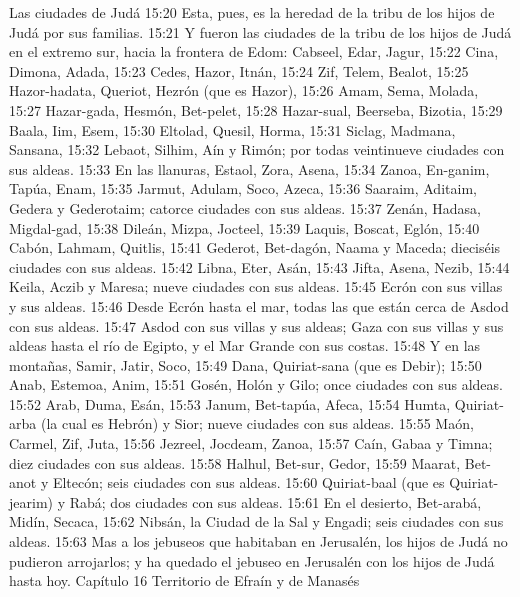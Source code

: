 Las ciudades de Judá 
15:20 Esta, pues, es la heredad de la tribu de los hijos de Judá por sus familias.  
15:21 Y fueron las ciudades de la tribu de los hijos de Judá en el extremo sur, hacia la frontera de Edom: Cabseel, Edar, Jagur,  
15:22 Cina, Dimona, Adada,  
15:23 Cedes, Hazor, Itnán,  
15:24 Zif, Telem, Bealot,  
15:25 Hazor-hadata, Queriot, Hezrón (que es Hazor),  
15:26 Amam, Sema, Molada,  
15:27 Hazar-gada, Hesmón, Bet-pelet,  
15:28 Hazar-sual, Beerseba, Bizotia,  
15:29 Baala, Iim, Esem,  
15:30 Eltolad, Quesil, Horma,  
15:31 Siclag, Madmana, Sansana,  
15:32 Lebaot, Silhim, Aín y Rimón; por todas veintinueve ciudades con sus aldeas.  
15:33 En las llanuras, Estaol, Zora, Asena,  
15:34 Zanoa, En-ganim, Tapúa, Enam,  
15:35 Jarmut, Adulam, Soco, Azeca,  
15:36 Saaraim, Aditaim, Gedera y Gederotaim; catorce ciudades con sus aldeas.  
15:37 Zenán, Hadasa, Migdal-gad,  
15:38 Dileán, Mizpa, Jocteel,  
15:39 Laquis, Boscat, Eglón,  
15:40 Cabón, Lahmam, Quitlis,  
15:41 Gederot, Bet-dagón, Naama y Maceda; dieciséis ciudades con sus aldeas.  
15:42 Libna, Eter, Asán,  
15:43 Jifta, Asena, Nezib,  
15:44 Keila, Aczib y Maresa; nueve ciudades con sus aldeas. 
15:45 Ecrón con sus villas y sus aldeas.  
15:46 Desde Ecrón hasta el mar, todas las que están cerca de Asdod con sus aldeas.  
15:47 Asdod con sus villas y sus aldeas; Gaza con sus villas y sus aldeas hasta el río de Egipto, y el Mar Grande con sus costas.  
15:48 Y en las montañas, Samir, Jatir, Soco,  
15:49 Dana, Quiriat-sana (que es Debir);  
15:50 Anab, Estemoa, Anim,  
15:51 Gosén, Holón y Gilo; once ciudades con sus aldeas.  
15:52 Arab, Duma, Esán,  
15:53 Janum, Bet-tapúa, Afeca,  
15:54 Humta, Quiriat-arba (la cual es Hebrón) y Sior; nueve ciudades con sus aldeas.  
15:55 Maón, Carmel, Zif, Juta,  
15:56 Jezreel, Jocdeam, Zanoa,  
15:57 Caín, Gabaa y Timna; diez ciudades con sus aldeas.  
15:58 Halhul, Bet-sur, Gedor,  
15:59 Maarat, Bet-anot y Eltecón; seis ciudades con sus aldeas.  
15:60 Quiriat-baal (que es Quiriat-jearim) y Rabá; dos ciudades con sus aldeas.  
15:61 En el desierto, Bet-arabá, Midín, Secaca,  
15:62 Nibsán, la Ciudad de la Sal y Engadi; seis ciudades con sus aldeas. 
15:63 Mas a los jebuseos que habitaban en Jerusalén, los hijos de Judá no pudieron arrojarlos; y ha quedado el jebuseo en Jerusalén con los hijos de Judá hasta hoy. 
Capítulo 16 
Territorio de Efraín y de Manasés  

